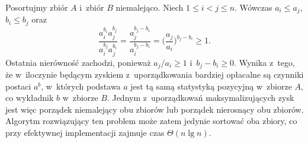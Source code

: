 \exercise %
Posortujmy zbiór $A$ i~zbiór $B$ niemalejąco.
Niech $1\le i<j\le n$.
Wówczas $a_i\le a_j$, $b_i\le b_j$ oraz
\[
	\frac{a_i^{b_i}a_j^{b_j}}{a_i^{b_j}a_j^{b_i}} = \frac{a_j^{b_j-b_i}}{a_i^{b_j-b_i}} = \biggl(\frac{a_j}{a_i}\biggr)^{b_j-b_i} \ge 1.
\]
Ostatnia nierówność zachodzi, ponieważ $a_j/a_i\ge1$ i~$b_j-b_i\ge0$.
Wynika z~tego, że w~iloczynie będącym zyskiem z~uporządkowania bardziej opłacalne są czynniki postaci $a^b$, w~których podstawa $a$ jest tą samą statystyką pozycyjną w~zbiorze $A$, co wykładnik $b$ w~zbiorze $B$.
Jednym z~uporządkowań maksymalizujących zysk jest więc porządek niemalejący obu zbiorów lub porządek nierosnący obu zbiorów.
Algorytm rozwiązujący ten problem może zatem jedynie sortować oba zbiory, co przy efektywnej implementacji zajmuje czas $\Theta(n\lg n)$.
